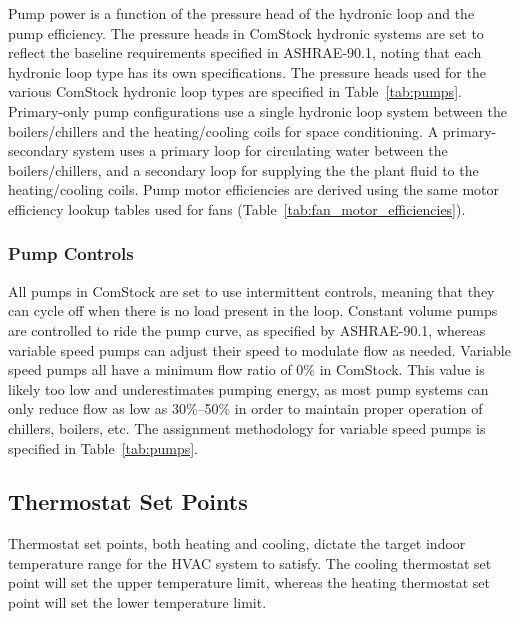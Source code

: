 Pump power is a function of the pressure head of the hydronic loop and the pump efficiency. The pressure heads in ComStock hydronic systems are set to reflect the baseline requirements specified in ASHRAE-90.1, noting that each hydronic loop type has its own specifications. The pressure heads used for the various ComStock hydronic loop types are specified in Table~\ref{tab:pumps}. Primary-only pump configurations use a single hydronic loop system between the boilers/chillers and the heating/cooling coils for space conditioning. A primary-secondary system uses a primary loop for circulating water between the boilers/chillers, and a secondary loop for supplying the the plant fluid to the heating/cooling coils. Pump motor efficiencies are derived using the same motor efficiency lookup tables used for fans (Table~\ref{tab:fan_motor_efficiencies}).

\subsubsection{Pump Controls}

All pumps in ComStock are set to use intermittent controls, meaning that they can cycle off when there is no load present in the loop. Constant volume pumps are controlled to ride the pump curve, as specified by ASHRAE-90.1, whereas variable speed pumps can adjust their speed to modulate flow as needed. Variable speed pumps all have a minimum flow ratio of 0\% in ComStock. This value is likely too low and underestimates pumping energy, as most pump systems can only reduce flow as low as 30\%--50\% in order to maintain proper operation of chillers, boilers, etc. The assignment methodology for variable speed pumps is specified in Table~\ref{tab:pumps}.




\subsection{Thermostat Set Points} \label{section:therm_setpoints}
Thermostat set points, both heating and cooling, dictate the target indoor temperature range for the HVAC system to satisfy. The cooling thermostat set point will set the upper temperature limit, whereas the heating thermostat set point will set the lower temperature limit.

